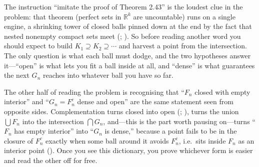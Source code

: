 \documentclass[main.tex]{subfiles}
\begin{document}
\begin{Reflection}
The instruction ``imitate the proof of Theorem 2.43'' is the loudest clue in the problem: that theorem (perfect sets in $\mathbb R^k$ are uncountable) runs on a single engine, a shrinking tower of closed balls pinned down at the end by the fact that nested nonempty compact sets meet (; ). So before reading another word you should expect to build $K_1\supseteq K_2\supseteq\cdots$ and harvest a point from the intersection. The only question is what each ball must dodge, and the two hypotheses answer it---``open'' is what lets you fit a ball inside at all, and ``dense'' is what guarantees the next $G_n$ reaches into whatever ball you have so far.

The other half of reading the problem is recognising that ``$F_n$ closed with empty interior'' and ``$G_n=F_n^c$ dense and open'' are the same statement seen from opposite sides. Complementation turns closed into open (; ), turns the union $\bigcup F_n$ into the intersection $\bigcap G_n$, and---this is the part worth pausing on---turns ``$F_n$ has empty interior'' into ``$G_n$ is dense,'' because a point fails to be in the closure of $F_n^c$ exactly when some ball around it avoids $F_n^c$, i.e.\ sits inside $F_n$ as an interior point (). Once you see this dictionary, you prove whichever form is easier and read the other off for free.


\end{Reflection}
\end{document}
